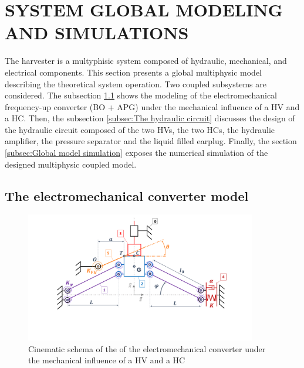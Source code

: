 \documentclass[3p,twocolumn,preprint]{elsarticle}
\begin{document}
\section{SYSTEM GLOBAL MODELING AND SIMULATIONS}
\label{sec:SYSTEM MODELING AND SIMULATIONS}
The harvester is a multyphisic system composed of hydraulic, mechanical, and electrical components. This section presents a global multiphysic model describing the theoretical system operation. Two coupled subsystems are considered. The subsection \ref{subsec:The electromechanical converter} shows the modeling of the electromechanical frequency-up converter (BO + APG) under the mechanical influence of a HV and a HC. Then, the subsection \ref{subsec:The hydraulic circuit} discusses the design of the hydraulic circuit composed of the two HVs, the two HCs, the hydraulic amplifier, the pressure separator and the liquid filled earplug. Finally, the section \ref{subsec:Global model simulation} exposes the numerical simulation of the designed multiphysic coupled model.

	\subsection{The electromechanical converter model}	
	\label{subsec:The electromechanical converter}
\begin{figure}[!htbp]
	\centering
	\captionsetup{justification=centering}
	\includegraphics[trim={0cm 0cm 0cm 0cm},clip, width=0.9\textwidth]{figures/schema_cinematique1.pdf}
	\caption{Cinematic schema of the of the electromechanical converter under the mechanical influence of a HV and a HC}
	\label{fig:schema_cinematique1}
\end{figure}
\end{document}
